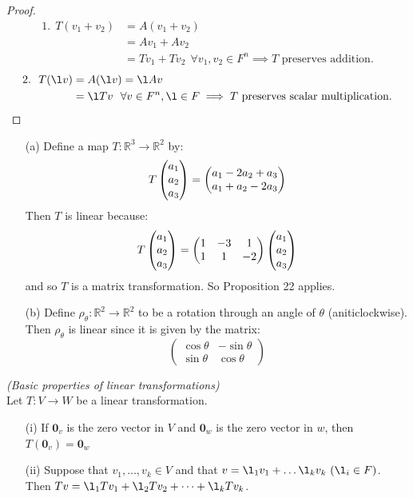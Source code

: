 \documentclass[twoside]{scrartcl}
\begin{document}
\begin{proof}
\[
\begin{aligned}
1.~~ T(v_1 + v_2) &= A(v_1 + v_2)\\
&= Av_1 + Av_2 \\
&= Tv_1 + Tv_2~~ \forall v_1,v_2 \in F^n \implies T \text{ preserves addition.}
\end{aligned}\]
\[\begin{aligned}
2.~~ T(\l v) &= A(\l v) = \l A v \\
&= \l Tv ~~ \forall v \in F^n, \l \in F \implies T \text{ preserves scalar multiplication.}\qedhere
\end{aligned}
\]
\end{proof}

\begin{examples}
\begin{itemize}
\item[(a)] 
Define a map $T: \mathbb{R}^3 \to \mathbb{R}^2$ by:
\[
T\Spvek{a_1;a_2;a_3} = \Spvek{a_1 - 2a_2 + a_3; a_1 + a_2 - 2a_3}
\]
Then $T$ is linear because:
\[
T\Spvek{a_1;a_2;a_3} = \begin{pmatrix}
 1 & -3 & 1 \\ 1 & 1 & -2
 \end{pmatrix}
\Spvek{a_1;a_2;a_3}
\]
and so $T$ is a matrix transformation. So Proposition 22 applies.

\item[(b)] Define $\rho_{\theta}: \mathbb{R}^2 \to \mathbb{R}^2$ to be a rotation through an angle of $\theta$ (aniticlockwise). Then $\rho_{\theta}$ is linear since it is given by the matrix:\[
\begin{pmatrix}
\cos\theta & -\sin\theta \\ 
\sin\theta & \cos\theta
\end{pmatrix} \]

\end{itemize}
\end{examples}\vspace*{10pt}


\begin{proposition}\emph{(Basic properties of linear transformations)} \\

Let $T: V \to W$ be a linear transformation.

\begin{enumerate}
\item[(i)] If $\mathbf{0}_v$ is the zero vector in $V$ and $\mathbf{0}_w$ is the zero vector in $w$, then $T(\mathbf{0}_v) = \mathbf{0}_w$
\item[(ii)] Suppose that $v_1, \dots, v_k \in V$ and that $v = \l_1v_1 + \dots \l_kv_k ~(\l_i \in F)$. Then $Tv = \l_1Tv_1 + \l_2Tv_2 + \dots + \l_kTv_k$.
\end{enumerate}
\end{proposition}
\end{document}
